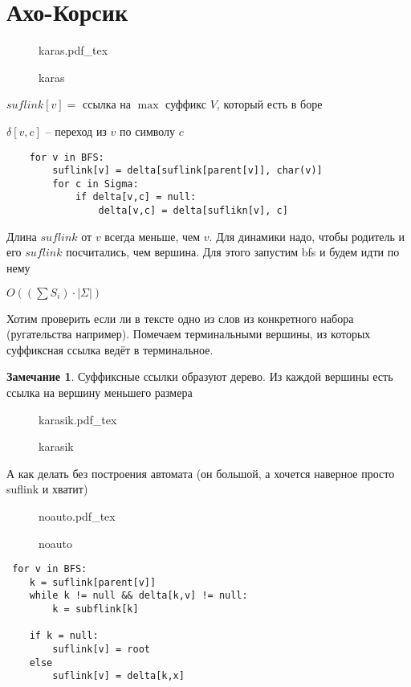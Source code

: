 \documentclass{book}
\theoremstyle{definition}
\newtheorem*{note}{Замечание}
\newcommand{\incfig}[1]{%
    \def\svgwidth{\columnwidth}
    {#1.pdf_tex}
}
\begin{document}
\section{Ахо-Корсик}

\begin{figure}[!ht]
    \centering
    \incfig{karas}
    \caption{karas}
    \label{fig:karas}
\end{figure}

$suflink[v]=$ ссылка на  $\max$ суффикс  $V$, который есть в боре

$\delta[v,c] $ -- переход из  $v$ по символу  $c$

 \begin{lstlisting}
    for v in BFS:
        suflink[v] = delta[suflink[parent[v]], char(v)]
        for c in Sigma:
            if delta[v,c] = null:
                delta[v,c] = delta[suflikn[v], c]
\end{lstlisting}            

Длина $suflink$ от  $v$ всегда меньше, чем  $v$. Для динамики надо, чтобы родитель и его  $suflink$ посчитались, чем вершина. Для этого запустим bfs и будем идти по нему

$O\left( \left( \sum S_i \right) \cdot \left| \Sigma \right|  \right) $

Хотим проверить если ли в тексте одно из слов из конкретного набора (ругательства например). Помечаем терминальными вершины, из которых суффиксная ссылка ведёт в терминальное.

\begin{note}
    Суффиксные ссылки образуют дерево. Из каждой вершины есть ссылка на вершину меньшего размера
\end{note}

\begin{figure}[!ht]
    \centering
    \incfig{karasik}
    \caption{karasik}
    \label{fig:karasik}
\end{figure}


А как делать без построения автомата (он большой, а хочется наверное просто suflink и хватит)

\begin{figure}[!ht]
    \centering
    \incfig{noauto}
    \caption{noauto}
    \label{fig:noauto}
\end{figure}

 \begin{lstlisting}
 for v in BFS:
    k = suflink[parent[v]]
    while k != null && delta[k,v] != null:
        k = subflink[k]

    if k = null:
        suflink[v] = root
    else 
        suflink[v] = delta[k,x]
\end{lstlisting}    
\end{document}
